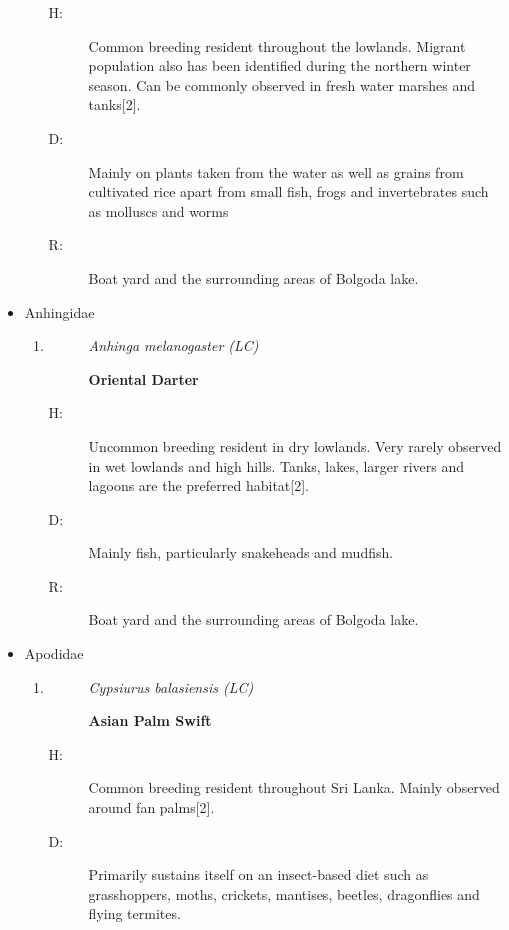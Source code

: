 \begin{itemize}
\begin{enumerate}
\begin{description}%
\item[H: ]%
Common breeding resident throughout the lowlands. Migrant population also has been identified during the northern winter season. Can be commonly observed in fresh water marshes and tanks{[}2{]}.%
\item[D: ]%
Mainly on plants taken from the water as well as grains from cultivated rice apart from small fish, frogs and invertebrates such as molluscs and worms%
\item[R: ]%
Boat yard and the surrounding areas of Bolgoda lake.%
\end{description}%
\end{enumerate}%
\item%
Anhingidae%
\begin{enumerate}%
\item%
\begin{description}%
\item[]%
\textit{Anhinga melanogaster (LC)}%
\item[]%
\textbf{Oriental Darter}%
\end{description}%
\begin{description}%
\item[H: ]%
Uncommon breeding resident in dry lowlands. Very rarely observed in wet lowlands and high hills. Tanks, lakes, larger rivers and lagoons are the preferred habitat{[}2{]}.%
\item[D: ]%
Mainly fish, particularly snakeheads and mudfish.%
\item[R: ]%
Boat yard and the surrounding areas of Bolgoda lake.%
\end{description}%
\end{enumerate}%
\item%
Apodidae%
\begin{enumerate}%
\item%
\begin{description}%
\item[]%
\textit{Cypsiurus balasiensis (LC)}%
\item[]%
\textbf{Asian Palm Swift}%
\end{description}%
\begin{description}%
\item[H: ]%
Common breeding resident throughout Sri Lanka. Mainly observed around fan palms{[}2{]}.%
\item[D: ]%
Primarily sustains itself on an insect{-}based diet such as grasshoppers, moths, crickets, mantises, beetles, dragonflies and flying termites.%

\end{description}
\end{enumerate}
\end{itemize}

